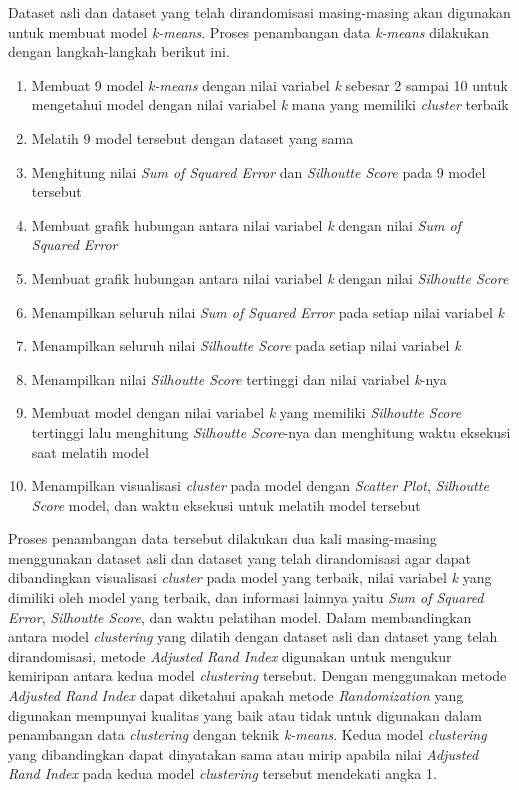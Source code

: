 Dataset asli dan dataset yang telah dirandomisasi masing-masing akan digunakan untuk membuat model \textit{k-means}. Proses penambangan data \textit{k-means} dilakukan dengan langkah-langkah berikut ini.
\begin{enumerate}
    \item Membuat 9 model \textit{k-means} dengan nilai variabel \textit{k} sebesar 2 sampai 10 untuk mengetahui model dengan nilai variabel \textit{k} mana yang memiliki \textit{cluster} terbaik
    \item Melatih 9 model tersebut dengan dataset yang sama
    \item Menghitung nilai \textit{Sum of Squared Error} dan \textit{Silhoutte Score} pada 9 model tersebut
    \item Membuat grafik hubungan antara nilai variabel \textit{k} dengan nilai \textit{Sum of Squared Error}
    \item Membuat grafik hubungan antara nilai variabel \textit{k} dengan nilai \textit{Silhoutte Score}
    \item Menampilkan seluruh nilai \textit{Sum of Squared Error} pada setiap nilai variabel \textit{k}
    \item Menampilkan seluruh nilai \textit{Silhoutte Score} pada setiap nilai variabel \textit{k}
    \item Menampilkan nilai \textit{Silhoutte Score} tertinggi dan nilai variabel \textit{k}-nya
    \item Membuat model dengan nilai variabel \textit{k} yang memiliki \textit{Silhoutte Score} tertinggi lalu menghitung \textit{Silhoutte Score}-nya dan menghitung waktu eksekusi saat melatih model
    \item Menampilkan visualisasi \textit{cluster} pada model dengan \textit{Scatter Plot}, \textit{Silhoutte Score} model, dan waktu eksekusi untuk melatih model tersebut
\end{enumerate}
Proses penambangan data tersebut dilakukan dua kali masing-masing menggunakan dataset asli dan dataset yang telah dirandomisasi agar dapat dibandingkan visualisasi \textit{cluster} pada model yang terbaik, nilai variabel \textit{k} yang dimiliki oleh model yang terbaik, dan informasi lainnya yaitu \textit{Sum of Squared Error}, \textit{Silhoutte Score}, dan waktu pelatihan model. Dalam membandingkan antara model \textit{clustering} yang dilatih dengan dataset asli dan dataset yang telah dirandomisasi, metode \textit{Adjusted Rand Index} digunakan untuk mengukur kemiripan antara kedua model \textit{clustering} tersebut. Dengan menggunakan metode \textit{Adjusted Rand Index} dapat diketahui apakah metode \textit{Randomization} yang digunakan mempunyai kualitas yang baik atau tidak untuk digunakan dalam penambangan data \textit{clustering} dengan teknik \textit{k-means}. Kedua model \textit{clustering} yang dibandingkan dapat dinyatakan sama atau mirip apabila nilai \textit{Adjusted Rand Index} pada kedua model \textit{clustering} tersebut mendekati angka 1.

